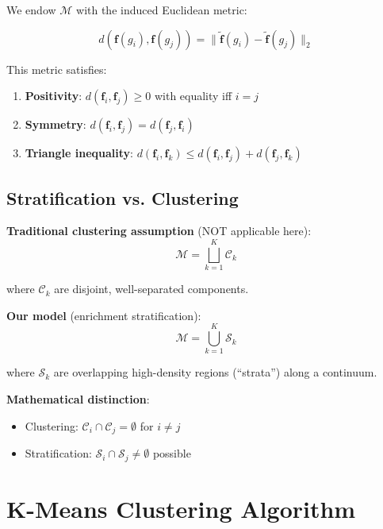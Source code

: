 \documentclass[12pt,letterpaper]{article}
\theoremstyle{definition}
\theoremstyle{remark}
\begin{document}
We endow $\mathcal{M}$ with the induced Euclidean metric:

\begin{equation}
d(\mathbf{f}(g_i), \mathbf{f}(g_j)) = \|\tilde{\mathbf{f}}(g_i) - \tilde{\mathbf{f}}(g_j)\|_2
\end{equation}

This metric satisfies:
\begin{enumerate}
    \item \textbf{Positivity}: $d(\mathbf{f}_i, \mathbf{f}_j) \geq 0$ with equality iff $i = j$
    \item \textbf{Symmetry}: $d(\mathbf{f}_i, \mathbf{f}_j) = d(\mathbf{f}_j, \mathbf{f}_i)$
    \item \textbf{Triangle inequality}: $d(\mathbf{f}_i, \mathbf{f}_k) \leq d(\mathbf{f}_i, \mathbf{f}_j) + d(\mathbf{f}_j, \mathbf{f}_k)$
\end{enumerate}

\subsection{Stratification vs. Clustering}

\textbf{Traditional clustering assumption} (NOT applicable here):
\begin{equation}
\mathcal{M} = \bigsqcup_{k=1}^K \mathcal{C}_k
\end{equation}

where $\mathcal{C}_k$ are disjoint, well-separated components.

\textbf{Our model} (enrichment stratification):
\begin{equation}
\mathcal{M} = \bigcup_{k=1}^K \mathcal{S}_k
\end{equation}

where $\mathcal{S}_k$ are overlapping high-density regions (``strata'') along a continuum.

\textbf{Mathematical distinction}:
\begin{itemize}
    \item Clustering: $\mathcal{C}_i \cap \mathcal{C}_j = \emptyset$ for $i \neq j$
    \item Stratification: $\mathcal{S}_i \cap \mathcal{S}_j \neq \emptyset$ possible
\end{itemize}

\section{K-Means Clustering Algorithm}
\end{document}
